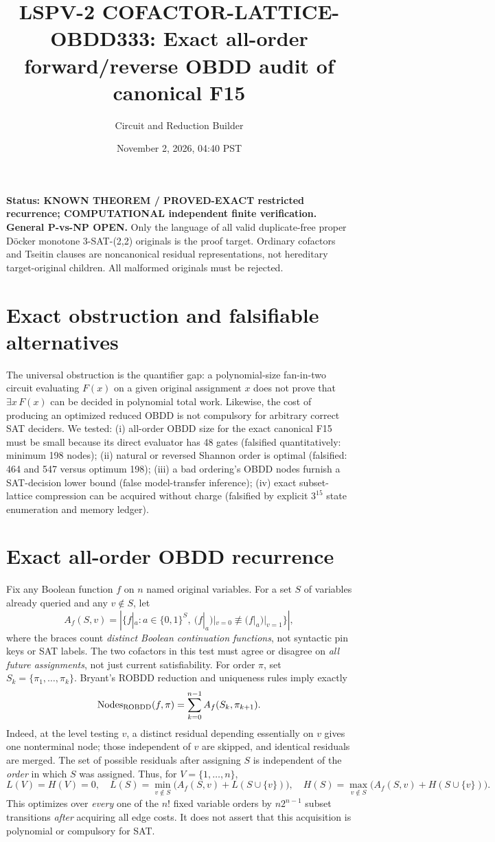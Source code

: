 \documentclass[11pt]{article}
\title{LSPV-2 COFACTOR-LATTICE-OBDD333: Exact all-order forward/reverse OBDD audit of canonical F15}
\author{Circuit and Reduction Builder}
\date{November 2, 2026, 04:40 PST}
\begin{document}
\maketitle
\noindent\textbf{Status: KNOWN THEOREM / PROVED-EXACT restricted recurrence; COMPUTATIONAL independent finite verification. General P-vs-NP OPEN.}
Only the language of all valid duplicate-free proper D\"ocker monotone 3-SAT-(2,2) originals is the proof target. Ordinary cofactors and Tseitin clauses are noncanonical residual representations, not hereditary target-original children. All malformed originals must be rejected.

\section{Exact obstruction and falsifiable alternatives}
The universal obstruction is the quantifier gap: a polynomial-size fan-in-two circuit evaluating $F(x)$ on a given original assignment $x$ does not prove that $\exists x\,F(x)$ can be decided in polynomial total work. Likewise, the cost of producing an optimized reduced OBDD is not compulsory for arbitrary correct SAT deciders. We tested: (i) all-order OBDD size for the exact canonical F15 must be small because its direct evaluator has 48 gates (falsified quantitatively: minimum 198 nodes); (ii) natural or reversed Shannon order is optimal (falsified: 464 and 547 versus optimum 198); (iii) a bad ordering's OBDD nodes furnish a SAT-decision lower bound (false model-transfer inference); (iv) exact subset-lattice compression can be acquired without charge (falsified by explicit $3^{15}$ state enumeration and memory ledger).

\section{Exact all-order OBDD recurrence}
Fix any Boolean function $f$ on $n$ named original variables. For a set $S$ of variables already queried and any $v\notin S$, let
\[
 A_f(S,v)=\left|\{f|_a:a\in\{0,1\}^S,\ (f|_a)|_{v=0}\not\equiv(f|_a)|_{v=1}\}\right|,
\]
where the braces count \emph{distinct Boolean continuation functions}, not syntactic pin keys or SAT labels. The two cofactors in this test must agree or disagree on \emph{all future assignments}, not just current satisfiability. For order $\pi$, set $S_k=\{\pi_1,\ldots,\pi_k\}$. Bryant's ROBDD reduction and uniqueness rules imply exactly
\[
   {\rm Nodes}_{\rm ROBDD}(f,\pi)=\sum_{k=0}^{n-1} A_f(S_k,\pi_{k+1}).
\]
Indeed, at the level testing $v$, a distinct residual depending essentially on $v$ gives one nonterminal node; those independent of $v$ are skipped, and identical residuals are merged. The set of possible residuals after assigning $S$ is independent of the \emph{order} in which $S$ was assigned. Thus, for $V=\{1,\ldots,n\}$,
\[
 L(V)=H(V)=0,\quad
 L(S)=\min_{v\notin S}\bigl(A_f(S,v)+L(S\cup\{v\})\bigr),\quad
 H(S)=\max_{v\notin S}\bigl(A_f(S,v)+H(S\cup\{v\})\bigr).
\]
This optimizes over \emph{every} one of the $n!$ fixed variable orders by $n2^{n-1}$ subset transitions \emph{after} acquiring all edge costs. It does not assert that this acquisition is polynomial or compulsory for SAT.
\end{document}
